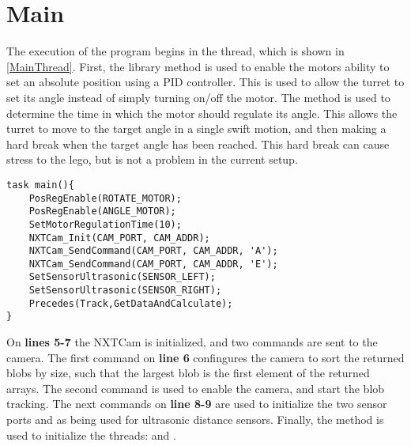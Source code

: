 \section{Main}
The execution of the program begins in the  thread, which is shown
in \autoref{MainThread}. First, the library method
 is used to enable the motors ability to set
an absolute position using a PID controller. This is used to allow the turret to set its angle instead of simply turning on/off the motor.
The  method is used to determine the
time in which the motor should regulate its angle. This allows the turret to
move to the target angle in a single swift motion, and then making a hard break
when the target angle has been reached. This hard break can cause stress to the
lego, but is not a problem in the current setup.\nl

\begin{minipage}[H]{\linewidth}
\begin{lstlisting}[caption = Entry point for the program execution., label = MainThread] 
task main(){
    PosRegEnable(ROTATE_MOTOR);
    PosRegEnable(ANGLE_MOTOR);
    SetMotorRegulationTime(10);
    NXTCam_Init(CAM_PORT, CAM_ADDR);
    NXTCam_SendCommand(CAM_PORT, CAM_ADDR, 'A');
    NXTCam_SendCommand(CAM_PORT, CAM_ADDR, 'E');
    SetSensorUltrasonic(SENSOR_LEFT);
    SetSensorUltrasonic(SENSOR_RIGHT);
    Precedes(Track,GetDataAndCalculate);
}
\end{lstlisting}
\end{minipage}

On \textbf{lines 5-7} the NXTCam is initialized, and two commands are
sent to the camera. The first command on \textbf{line 6} confingures the camera
to sort the returned blobs by size, such that the largest blob is the first
element of the returned arrays. The second command is used to enable the camera,
and start the blob tracking. The next commands on \textbf{line 8-9} are used to
initialize the two sensor ports  and
 as being used for ultrasonic distance sensors.
Finally, the  method is used to initialize the
threads:  and .
